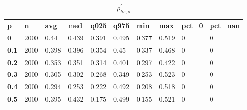 \begin{table}[h]
 \centering 
\footnotesize
\caption{$\rho_{hs,s}^\prime $}
\label{tab:alphahss}
\begin{tabular}[h]{| l l l l l l l l l l|
    } \hline
\textbf{ p} & \textbf{ n} & \textbf{ avg} & \textbf{ med} & \textbf{ q025} & \textbf{ q975} & \textbf{ min} & \textbf{ max} & \textbf{ pct\_0} & \textbf{ pct\_nan}
           \\
  \textbf{  0} & 2000 &  0.44 & 0.439 & 0.391 & 0.495 & 0.377 & 0.519 & 0 & 0
           \\
  \textbf{0.1} & 2000 & 0.398 & 0.396 & 0.354 &  0.45 & 0.337 & 0.468 & 0 & 0
           \\
  \textbf{0.2} & 2000 & 0.353 & 0.351 & 0.314 & 0.401 & 0.297 & 0.422 & 0 & 0
           \\
  \textbf{0.3} & 2000 & 0.305 & 0.302 & 0.268 & 0.349 & 0.253 & 0.523 & 0 & 0
           \\
  \textbf{0.4} & 2000 & 0.294 & 0.253 & 0.222 & 0.492 & 0.208 & 0.518 & 0 & 0
           \\
  \textbf{0.5} & 2000 & 0.395 & 0.432 & 0.175 & 0.499 & 0.155 & 0.521 & 0 & 0
           \\
 \hline \end{tabular}
 \end{table}
